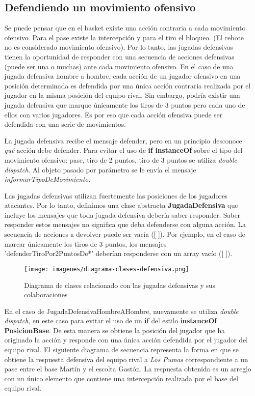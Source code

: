 \subsection{Defendiendo un movimiento ofensivo}

Se puede pensar que en el basket existe una acción contraria a cada movimiento ofensivo. Para el pase existe la intercepción y para el tiro el bloqueo. (El rebote no es considerado
movimiento ofensivo). Por lo tanto, las jugadas defensivas tienen la oportunidad de responder con una secuencia de acciones defensivas (puede ser una o muchas) ante cada movimiento
ofensivo. En el caso de una jugada defensiva hombre a hombre, cada acción de un jugador ofensivo en una posición determinada es defendida por una única acción 
contraria realizada por el jugador en la misma posición del equipo rival. Sin embargo, podría existir una jugada defensiva que marque únicamente los tiros de 3 puntos pero cada uno de ellos
con varios jugadores. Es por eso que cada acción ofensiva puede ser defendida con una serie de movimientos.

La jugada defensiva recibe el mensaje defender, pero en un principio desconoce \emph{qué} acción debe defender. Para evitar el uso de \textbf{if instanceOf} 
sobre el tipo del movimiento ofensivo: pase, tiro de 2 puntos, tiro de 3 puntos se utiliza \emph{double dispatch}.
Al objeto pasado por parámetro se le envía el mensaje \emph{informarTipoDeMovimiento}. 

Las jugadas defensivas utilizan fuertemente las posiciones de los jugadores atacantes. Por lo tanto, definimos una clase abstracta \textbf{JugadaDefensiva} que incluye los mensajes
que toda jugada defensiva debería saber responder. Saber responder estos mensajes no significa que deba defenderse con alguna acción. La secuencia de acciones a devolver puede ser 
vacía ([ ]). Por ejemplo, en el caso de marcar únicamente los tiros de 3 puntos, los mensajes 'defenderTiroPor2PuntosDe*' 
deberían responderse con un array vacío ([ ]).

\begin{figure}[h!]
  \texttt{[image: imagenes/diagrama-clases-defensiva.png]}
  \caption{Diagrama de clases relacionado con las jugadas defensivas y sus colaboraciones}
\end{figure}

En el caso de JugadaDefensivaHombreAHombre, nuevamente se utiliza \emph{double dispatch}, en este caso para evitar el uso de un \textbf{if} del estilo \textbf{instanceOf PosicionBase}.
De esta manera se obtiene la posición del jugador que ha originado la acción y responde con una única acción defendida por el jugador del equipo rival.
El siguiente diagrama de secuencia representa la forma en que se obtiene la respuesta defensiva del equipo rival a \emph{Los Pumas} correspondiente a un pase entre 
el base Martín y el escolta Gastón. La respuesta obtenida es un arreglo con un único elemento que contiene una intercepción realizada por el base del equipo rival.

